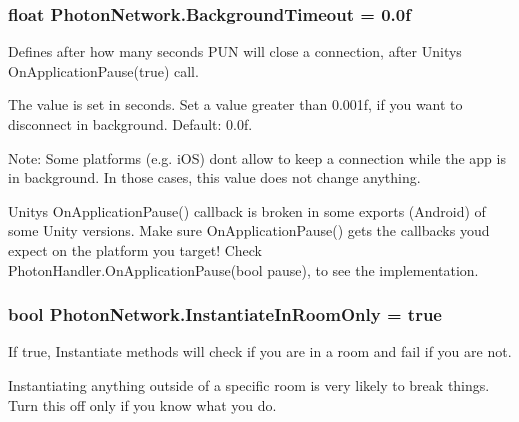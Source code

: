 \subsubsection[{\texorpdfstring{Background\+Timeout}{BackgroundTimeout}}]{\setlength{\rightskip}{0pt plus 5cm}float Photon\+Network.\+Background\+Timeout = 0.\+0f\hspace{0.3cm}{\ttfamily [static]}}\hypertarget{class_photon_network_ae4186352869ef922cb84efbd5c1f2465}{}\label{class_photon_network_ae4186352869ef922cb84efbd5c1f2465}


Defines after how many seconds P\+UN will close a connection, after Unity\textquotesingle{}s On\+Application\+Pause(true) call. 

The value is set in seconds. Set a value greater than 0.\+001f, if you want to disconnect in background. Default\+: 0.\+0f.

Note\+: Some platforms (e.\+g. i\+OS) don\textquotesingle{}t allow to keep a connection while the app is in background. In those cases, this value does not change anything.

Unity\textquotesingle{}s On\+Application\+Pause() callback is broken in some exports (Android) of some Unity versions. Make sure On\+Application\+Pause() gets the callbacks you\textquotesingle{}d expect on the platform you target! Check Photon\+Handler.\+On\+Application\+Pause(bool pause), to see the implementation.
\subsubsection[{\texorpdfstring{Instantiate\+In\+Room\+Only}{InstantiateInRoomOnly}}]{\setlength{\rightskip}{0pt plus 5cm}bool Photon\+Network.\+Instantiate\+In\+Room\+Only = true\hspace{0.3cm}{\ttfamily [static]}}\hypertarget{class_photon_network_ae0036d259f2b793b4838393837d4cf6d}{}\label{class_photon_network_ae0036d259f2b793b4838393837d4cf6d}


If true, Instantiate methods will check if you are in a room and fail if you are not. 

Instantiating anything outside of a specific room is very likely to break things. Turn this off only if you know what you do.
